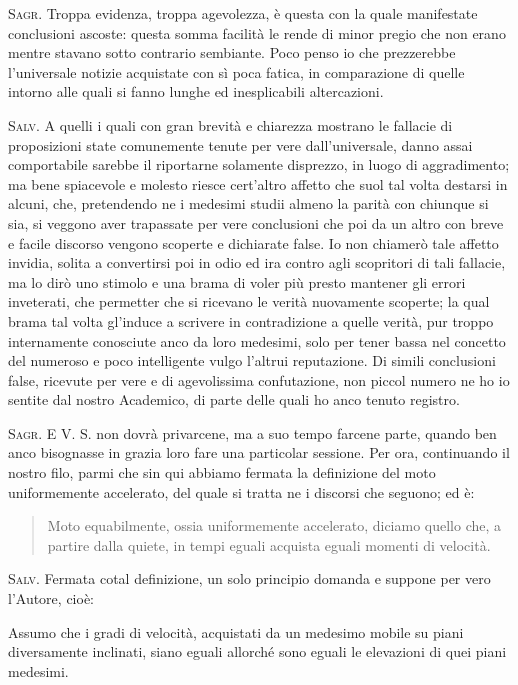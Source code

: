 \documentclass[11pt,twoside,openany]{book}
\newcommand{\speaker}[1]{\textcolor{rubric}{\textsc{#1}}\space}
\newenvironment{enunciato}{%
  \begin{quote}\itshape%
}{%
  \end{quote}%
}
\begin{document}
\speaker{Sagr.} Troppa evidenza, troppa agevolezza, è questa con la quale manifestate conclusioni ascoste: questa somma facilità le rende di minor pregio che non erano mentre stavano sotto contrario sembiante. Poco penso io che prezzerebbe l'universale notizie acquistate con sì poca fatica, in comparazione di quelle intorno alle quali si fanno lunghe ed inesplicabili altercazioni.

\speaker{Salv.} A quelli i quali con gran brevità e chiarezza mostrano le fallacie di proposizioni state comunemente tenute per vere dall'universale, danno assai comportabile sarebbe il riportarne solamente disprezzo, in luogo di aggradimento; ma bene spiacevole e molesto riesce cert'altro affetto che suol tal volta destarsi in alcuni, che, pretendendo ne i medesimi studii almeno la parità con chiunque si sia, si veggono aver trapassate per vere conclusioni che poi da un altro con breve e facile discorso vengono scoperte e dichiarate false. Io non chiamerò tale affetto invidia, solita a convertirsi poi in odio ed ira contro agli scopritori di tali fallacie, ma lo dirò uno stimolo e una brama di voler più presto mantener gli errori inveterati, che permetter che si ricevano le verità nuovamente scoperte; la qual brama tal volta gl'induce a scrivere in contradizione a quelle verità, pur troppo internamente conosciute anco da loro medesimi, solo per tener bassa nel concetto del numeroso e poco intelligente vulgo l'altrui reputazione. Di simili conclusioni false, ricevute per vere e di agevolissima confutazione, non piccol numero ne ho io sentite dal nostro Academico, di parte delle quali ho anco tenuto registro.

\speaker{Sagr.} E V. S. non dovrà privarcene, ma a suo tempo farcene parte, quando ben anco bisognasse in grazia loro fare una particolar sessione. Per ora, continuando il nostro filo, parmi che sin qui abbiamo fermata la definizione del moto uniformemente accelerato, del quale si tratta ne i discorsi che seguono; ed è:


\begin{enunciato}
Moto equabilmente, ossia uniformemente accelerato, diciamo quello che, a partire dalla quiete, in tempi eguali acquista eguali momenti di velocità.
\end{enunciato}

\speaker{Salv.} Fermata cotal definizione, un solo principio domanda e suppone per vero l'Autore, cioè:

Assumo che i gradi di velocità, acquistati da un medesimo mobile su piani diversamente inclinati, siano eguali allorché sono eguali le elevazioni di quei piani medesimi.
\end{document}
